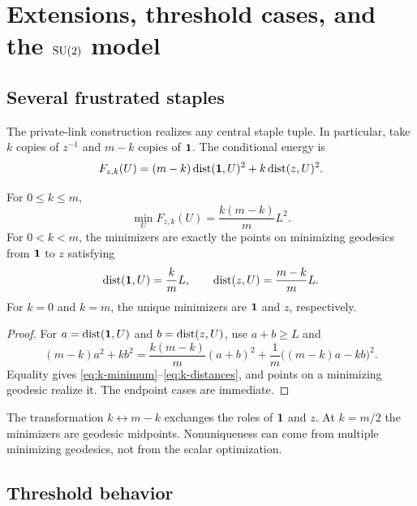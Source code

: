 \section{Extensions, threshold cases, and the \texorpdfstring{$\mathrm{SU}(2)$}{SU(2)} model}
\label{sec:extensions}

\subsection{Several frustrated staples}

The private-link construction realizes any central staple tuple.  In
particular, take $k$ copies of $z^{-1}$ and $m-k$ copies of $\mathbf 1$.  The
conditional energy is
\begin{equation}\label{eq:k-energy}
 F_{z,k}(U)=(m-k)\operatorname{dist}(\mathbf 1,U)^2+k\operatorname{dist}(z,U)^2.
\end{equation}

\begin{proposition}
\label{prop:k-frustrated}
For $0\leq k\leq m$,
\begin{equation}\label{eq:k-minimum}
 \min_UF_{z,k}(U)=\frac{k(m-k)}{m}L^2.
\end{equation}
For $0<k<m$, the minimizers are exactly the points on minimizing geodesics
from $\mathbf 1$ to $z$ satisfying
\begin{equation}\label{eq:k-distances}
 \operatorname{dist}(\mathbf 1,U)=\frac{k}{m}L,
 \qquad
 \operatorname{dist}(z,U)=\frac{m-k}{m}L.
\end{equation}
For $k=0$ and $k=m$, the unique minimizers are $\mathbf 1$ and $z$,
respectively.
\end{proposition}

\begin{proof}
For $a=\operatorname{dist}(\mathbf 1,U)$ and $b=\operatorname{dist}(z,U)$, use $a+b\geq L$ and
\begin{equation}\label{eq:k-square}
 (m-k)a^2+kb^2
 =\frac{k(m-k)}m(a+b)^2
  +\frac1m\bigl((m-k)a-kb\bigr)^2.
\end{equation}
Equality gives \eqref{eq:k-minimum}--\eqref{eq:k-distances}, and points on a
minimizing geodesic realize it.  The endpoint cases are immediate.
\end{proof}

The transformation $k\leftrightarrow m-k$ exchanges the roles of $\mathbf 1$ and
$z$.  At $k=m/2$ the minimizers are geodesic midpoints.  Nonuniqueness can
come from multiple minimizing geodesics, not from the scalar optimization.

\subsection{Threshold behavior}

